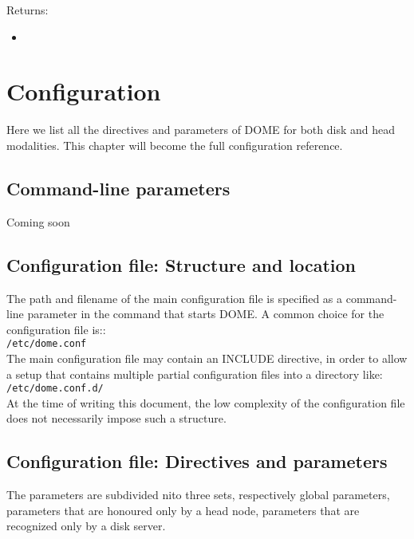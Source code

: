\documentclass[a4paper,10pt]{scrreprt}
\begin{document}
Returns:
\begin{itemize}
 \item 
\end{itemize}
 
 
 
 
 
\chapter{Configuration}
Here we list all the directives and parameters of DOME for both disk and head modalities. This chapter will become the full configuration reference.\\

\section{Command-line parameters}

Coming soon\\

\section{Configuration file: Structure and location}
The path and filename of the main configuration file is specified as a command-line parameter in the command that starts DOME. A common
choice for the configuration file is::\\

\lstinline"/etc/dome.conf"\\

The main configuration file may contain an INCLUDE directive, in order to allow a setup that contains multiple partial configuration files into a directory like:\\

\lstinline"/etc/dome.conf.d/"\\

At the time of writing this document, the low complexity of the configuration file does not necessarily impose such a structure.

\section{Configuration file: Directives and parameters}
The parameters are subdivided nito three sets, respectively global parameters, parameters that are honoured only by a head node, parameters that are recognized only by a disk server.
\end{document}
